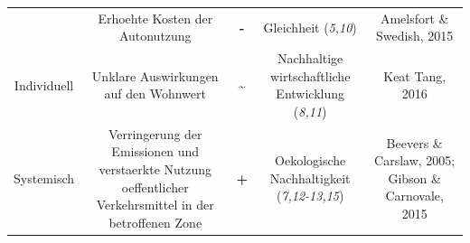 \documentclass[
]{book}
\begin{document}
\begin{longtable}[]{@{}ccccc@{}}
\begin{minipage}[t]{0.17\columnwidth}
\end{minipage} & \begin{minipage}[t]{0.16\columnwidth}\centering
Erhoehte Kosten der Autonutzung\strut
\end{minipage} & \begin{minipage}[t]{0.17\columnwidth}\centering
\textbf{-}\strut
\end{minipage} & \begin{minipage}[t]{0.17\columnwidth}\centering
Gleichheit (\emph{5,10})\strut
\end{minipage} & \begin{minipage}[t]{0.17\columnwidth}\centering
Amelsfort \& Swedish, 2015\strut
\end{minipage}\tabularnewline
\begin{minipage}[t]{0.17\columnwidth}\centering
Individuell\strut
\end{minipage} & \begin{minipage}[t]{0.16\columnwidth}\centering
Unklare Auswirkungen auf den Wohnwert\strut
\end{minipage} & \begin{minipage}[t]{0.17\columnwidth}\centering
\textbf{\textasciitilde{}}\strut
\end{minipage} & \begin{minipage}[t]{0.17\columnwidth}\centering
Nachhaltige wirtschaftliche Entwicklung (\emph{8,11})\strut
\end{minipage} & \begin{minipage}[t]{0.17\columnwidth}\centering
Keat Tang, 2016\strut
\end{minipage}\tabularnewline
\begin{minipage}[t]{0.17\columnwidth}\centering
Systemisch\strut
\end{minipage} & \begin{minipage}[t]{0.16\columnwidth}\centering
Verringerung der Emissionen und verstaerkte Nutzung oeffentlicher Verkehrsmittel in der betroffenen Zone\strut
\end{minipage} & \begin{minipage}[t]{0.17\columnwidth}\centering
\textbf{+}\strut
\end{minipage} & \begin{minipage}[t]{0.17\columnwidth}\centering
Oekologische Nachhaltigkeit (\emph{7,12-13,15})\strut
\end{minipage} & \begin{minipage}[t]{0.17\columnwidth}\centering
Beevers \& Carslaw, 2005; Gibson \& Carnovale, 2015\strut

\end{minipage}
\end{longtable}
\end{document}
